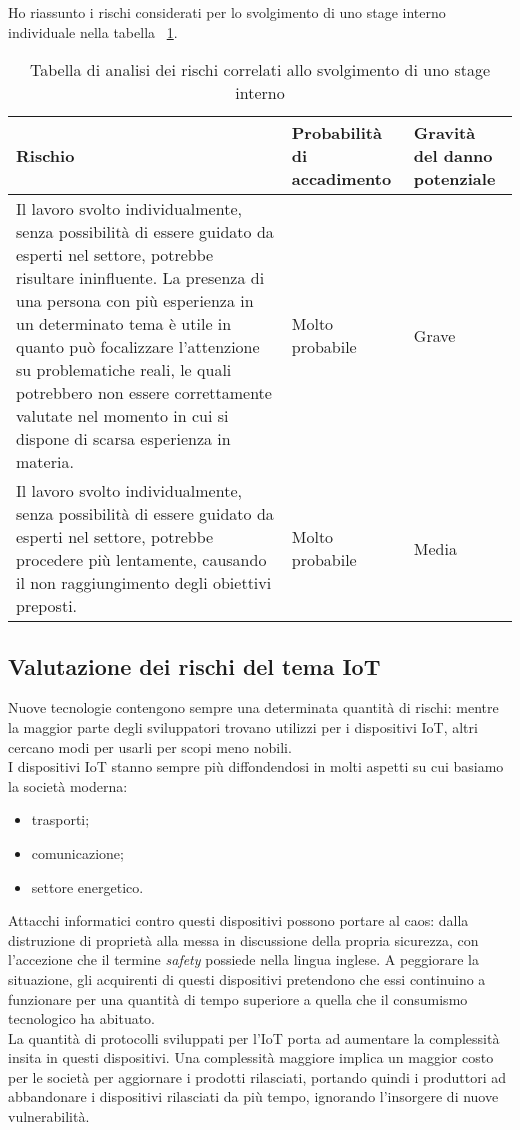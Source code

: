 Ho riassunto i rischi considerati per lo svolgimento di uno stage interno individuale nella tabella ~\ref{tab:rischi-stage-interno}.

\begin{table}
\caption{Tabella di analisi dei rischi correlati allo svolgimento di uno stage interno}
\label{tab:rischi-stage-interno}
\begin{tabularx}{\linewidth}{|p{7.5cm}|X|X|}
\hline
\textbf{Rischio} & \textbf{Probabilità di accadimento} & \textbf{Gravità del danno potenziale}\\
\hline
Il lavoro svolto individualmente, senza possibilità di essere guidato da esperti nel settore, potrebbe risultare ininfluente. La presenza di una persona con più esperienza in un determinato tema è utile in quanto può focalizzare l'attenzione su problematiche reali, le quali potrebbero non essere correttamente valutate nel momento in cui si dispone di scarsa esperienza in materia. & Molto probabile & Grave \\
\hline
Il lavoro svolto individualmente, senza possibilità di essere guidato da esperti nel settore, potrebbe procedere più lentamente, causando il non raggiungimento degli obiettivi preposti. & Molto probabile & Media \\
\hline
\end{tabularx}
\end{table}


\subsection{Valutazione dei rischi del tema IoT}

Nuove tecnologie contengono sempre una determinata quantità di rischi: mentre la maggior parte degli sviluppatori trovano utilizzi per i dispositivi IoT,
altri cercano modi per usarli per scopi meno nobili. \\
I dispositivi IoT stanno sempre più diffondendosi in molti aspetti su cui basiamo la società moderna:
\begin{itemize}
  \item trasporti;
  \item comunicazione;
  \item settore energetico.
\end{itemize}

Attacchi informatici contro questi dispositivi possono portare al caos: dalla distruzione di proprietà alla messa in discussione della propria sicurezza, con l'accezione che il termine \emph{safety} possiede nella lingua inglese.
A peggiorare la situazione, gli acquirenti di questi dispositivi pretendono che essi continuino a funzionare per una quantità di tempo superiore a quella che il consumismo tecnologico ha abituato. \\
La quantità di protocolli sviluppati per l'IoT porta ad aumentare la complessità insita in questi dispositivi.
Una complessità maggiore implica un maggior costo per le società per aggiornare i prodotti rilasciati, portando quindi i produttori ad abbandonare i dispositivi rilasciati da più tempo, ignorando l'insorgere di nuove vulnerabilità.

